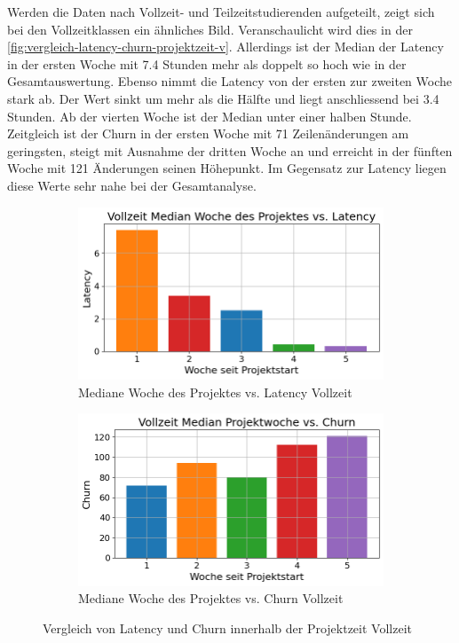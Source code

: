 Werden die Daten nach Vollzeit- und Teilzeitstudierenden aufgeteilt, zeigt sich bei den Vollzeitklassen ein ähnliches Bild. Veranschaulicht wird dies in der \autoref{fig:vergleich-latency-churn-projektzeit-v}. Allerdings ist der Median der Latency in der ersten Woche mit 7.4 Stunden mehr als doppelt so hoch wie in der Gesamtauswertung. Ebenso nimmt die Latency von der ersten zur zweiten Woche stark ab. Der Wert sinkt um mehr als die Hälfte und liegt anschliessend bei 3.4 Stunden. Ab der vierten Woche ist der Median unter einer halben Stunde. Zeitgleich ist der Churn in der ersten Woche mit 71 Zeilenänderungen am geringsten, steigt mit Ausnahme der dritten Woche an und erreicht in der fünften Woche mit 121 Änderungen seinen Höhepunkt. Im Gegensatz zur Latency liegen diese Werte sehr nahe bei der Gesamtanalyse.
\begin{figure}[htbp]
    \centering
    \begin{subfigure}[b]{0.48\textwidth}
        \centering
        \includegraphics[width=\textwidth]{Figures/mittelwert-woche-lateny-v.png}
        \caption{Mediane Woche des Projektes vs. Latency Vollzeit}
        \label{fig:mittelwert-woche-lateny-v}
    \end{subfigure}
    \hfill
    \begin{subfigure}[b]{0.48\textwidth}
        \centering
        \includegraphics[width=\textwidth]{Figures/mittelwert-woche-churn-v.png}
        \caption{Mediane Woche des Projektes vs. Churn Vollzeit}
        \label{fig:mittelwert-woche-churn-v}
    \end{subfigure}
    \caption{Vergleich von Latency und Churn innerhalb der Projektzeit Vollzeit}
    \label{fig:vergleich-latency-churn-projektzeit-v}
\end{figure}


